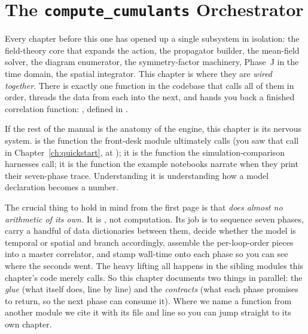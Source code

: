 \chapter{The \texttt{compute\_cumulants} Orchestrator}\label{ch:compute-orchestration}

Every chapter before this one has opened up a single subsystem in isolation: the
field-theory core that expands the action, the propagator builder, the
mean-field solver, the diagram enumerator, the symmetry-factor machinery, Phase~J
in the time domain, the spatial integrator. This chapter is where they are
\emph{wired together}. There is exactly one function in the codebase that calls
all of them in order, threads the data from each into the next, and hands you
back a finished correlation function: , defined in
.

If the rest of the manual is the anatomy of the engine, this chapter is its
nervous system.  is the function the front-desk module
 ultimately calls (you saw that call in
Chapter~\ref{ch:quickstart}, at ); it is the
function the simulation-comparison harnesses call; it is the function the example
notebooks narrate when they print their seven-phase trace. Understanding it is
understanding how a model declaration becomes a number.

The crucial thing to hold in mind from the first page is that
 \emph{does almost no arithmetic of its own.} It is
, not computation. Its job is to sequence seven phases,
carry a handful of data dictionaries between them, decide whether the model is
temporal or spatial and branch accordingly, assemble the per-loop-order pieces
into a master correlator, and stamp wall-time onto each phase so you can see
where the seconds went. The heavy lifting all happens in the sibling modules
this chapter's code merely calls. So this chapter documents two things in
parallel: the \emph{glue} (what  itself does, line by
line) and the \emph{contracts} (what each phase promises to return, so the next
phase can consume it). Where we name a function from another module we cite it
with its file and line so you can jump straight to its own chapter.

